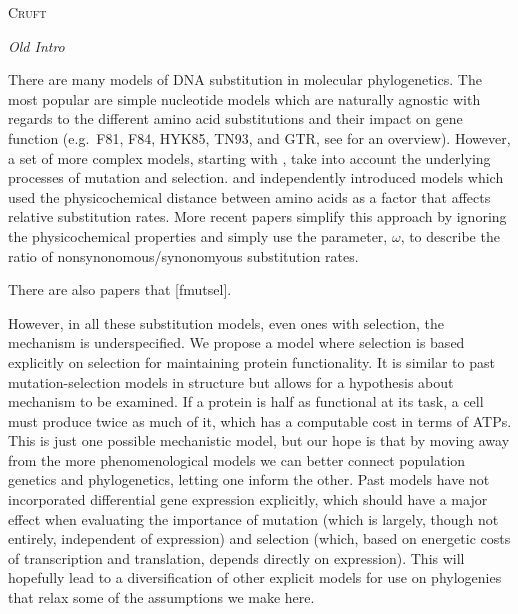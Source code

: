 \documentclass[12pt,letterpaper,fleqn]{article}
\renewcommand{\section}[1]{%
\bigskip
\begin{center}
\begin{Large}
\normalfont\scshape #1
\medskip
\end{Large}
\end{center}}
\renewcommand{\subsection}[1]{%
\bigskip
\begin{center}
\begin{large}
\normalfont\itshape #1
\end{large}
\end{center}}
\newcommand{\PC}{physicochemical\xspace}
\newcommand{\includeCruft}{0}%
\begin{document}
\ifthenelse{\includeCruft=1}
{


\pagebreak 

\section{Cruft}
\subsection{Old Intro}
There are many models of DNA substitution in molecular phylogenetics. 
The most popular are simple nucleotide models which are naturally agnostic with regards to the different amino acid substitutions and their impact on gene function (e.g.~F81, F84, HYK85, TN93, and GTR, see \citet{Yang2014} for an overview). 
However, a set of more complex models, starting with \citep{GoldmanAndYang1994,MuseAndGaut1994}, take into account the underlying processes of mutation and selection. 
\citet{GoldmanAndYang1994} and \citet{MuseAndGaut1994} independently introduced models which used the \PC distance between amino acids as a factor that affects relative substitution rates. 
More recent papers simplify this approach by ignoring the \PC properties and simply use the parameter, $\omega$, to describe the ratio of nonsynonomous/synonomyous substitution rates.

There are also papers that [fmutsel].

However, in all these substitution models, even ones with selection, the mechanism is underspecified. We propose a model where selection is based explicitly on selection for maintaining protein functionality.
It is similar to past mutation-selection models in structure but allows for a hypothesis about mechanism to be examined. If a protein is half as functional at its task, a cell must produce twice as much of it, which has a computable cost in terms of ATPs.
This is just one possible mechanistic model, but our hope is that by moving away from the more phenomenological models we can better connect population genetics and phylogenetics, letting one inform the other.
Past models have not incorporated differential gene expression explicitly, which should have a major effect when evaluating the importance of mutation (which is largely, though not entirely, independent of expression) and selection (which, based on energetic costs of transcription and translation, depends directly on expression).
This will hopefully lead to a diversification of other explicit models for use on phylogenies that relax some of the assumptions we make here.

}
\end{document}
